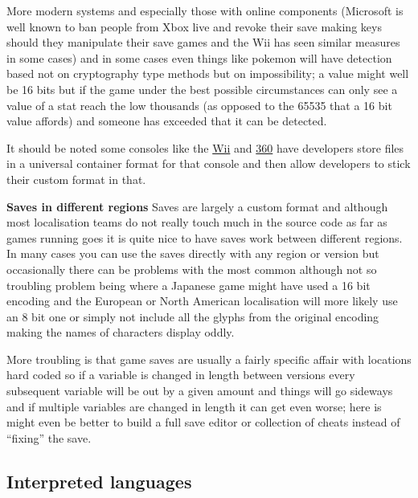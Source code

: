 \documentclass[
]{book}
\begin{document}
More modern systems and especially those with online components (Microsoft is well known to ban people from Xbox live and revoke their save making keys should they manipulate their save games and the Wii has seen similar measures in some cases) and in some cases even things like pokemon will have detection based not on cryptography type methods but on impossibility; a value might well be 16 bits but if the game under the best possible circumstances can only see a value of a stat reach the low thousands (as opposed to the 65535 that a 16 bit value affords) and someone has exceeded that it can be detected.

It should be noted some consoles like the \href{http://wiibrew.org/wiki/Savegame_Files}{Wii} and \href{http://free60.org/STFS}{360} have developers store files in a universal container format for that console and then allow developers to stick their custom format in that.

\textbf{Saves in different regions} Saves are largely a custom format and although most localisation teams do not really touch much in the source code as far as games running goes it is quite nice to have saves work between different regions. In many cases you can use the saves directly with any region or version but occasionally there can be problems with the most common although not so troubling problem being where a Japanese game might have used a 16 bit encoding and the European or North American localisation will more likely use an 8 bit one or simply not include all the glyphs from the original encoding making the names of characters display oddly.

More troubling is that game saves are usually a fairly specific affair with locations hard coded so if a variable is changed in length between versions every subsequent variable will be out by a given amount and things will go sideways and if multiple variables are changed in length it can get even worse; here is might even be better to build a full save editor or collection of cheats instead of ``fixing'' the save.

\hypertarget{interpreted-languages}{%
\subsection{Interpreted languages}\label{interpreted-languages}}
\end{document}
